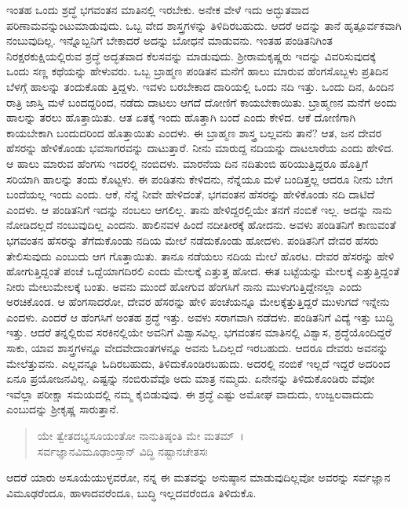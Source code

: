 ಇಂತಹ ಒಂದು ಶ್ರದ್ಧೆ ಭಗವಂತನ ಮಾತಿನಲ್ಲಿ ಇರಬೇಕು. ಅನೇಕ ವೇಳೆ ಇದು ಅದ್ಭುತವಾದ ಪರಿಣಾಮವನ್ನುಂಟುಮಾಡುವುದು. ಒಬ್ಬ ವೇದ ಶಾಸ್ತ್ರಗಳನ್ನು ತಿಳಿದಿರಬಹುದು. ಆದರೆ ಅದನ್ನು ತಾನೆ ಹೃತ್ಪೂರ್ವಕವಾಗಿ ನಂಬುವುದಿಲ್ಲ. ಇನ್ನೊಬ್ಬನಿಗೆ ಬೇಕಾದರೆ ಅದನ್ನು ಬೋಧನೆ ಮಾಡುವನು. ಇಂತಹ ಪಂಡಿತನಿಗಿಂತ ನಿರಕ್ಷರಕುಕ್ಷಿಯಲ್ಲಿರುವ ಶ್ರದ್ಧೆ ಅದ್ಭತವಾದ ಕೆಲಸವನ್ನು ಮಾಡುವುದು. ಶ‍್ರೀರಾಮಕೃಷ್ಣರು ಇದನ್ನು ವಿವರಿಸುವುದಕ್ಕೆ ಒಂದು ಸಣ್ಣ ಕಥೆಯನ್ನು ಹೇಳುವರು. ಒಬ್ಬ ಬ್ರಾಹ್ಮಣ ಪಂಡಿತನ ಮನೆಗೆ ಹಾಲು ಮಾರುವ ಹೆಂಗಸೊಬ್ಬಳು ಪ್ರತಿದಿನ ಬೆಳಗ್ಗೆ ಹಾಲನ್ನು ತಂದುಕೊಡು ತ್ತಿದ್ದಳು. ಇವಳು ಬರಬೇಕಾದ ದಾರಿಯಲ್ಲಿ ಒಂದು ನದಿ ಇತ್ತು. ಒಂದು ದಿನ, ಹಿಂದಿನ ರಾತ್ರಿ ಜಾಸ್ತಿ ಮಳೆ ಬಂದದ್ದರಿಂದ, ನಡೆದು ದಾಟಲು ಆಗದೆ ದೋಣಿಗೆ ಕಾಯಬೇಕಾಯಿತು. ಬ್ರಾಹ್ಮಣನ ಮನೆಗೆ ಅಂದು ಹಾಲನ್ನು ತರಲು ಹೊತ್ತಾಯಿತು. ಆತ ಏತಕ್ಕೆ ಇಂದು ಹೊತ್ತಾಗಿ ಬಂದೆ ಎಂದು ಕೇಳಿದ. ಆಕೆ ದೋಣಿಗಾಗಿ ಕಾಯಬೇಕಾಗಿ ಬಂದುದರಿಂದ ಹೊತ್ತಾಯಿತು ಎಂದಳು. ಈ ಬ್ರಾಹ್ಮಣ ಶಾಸ್ತ್ರ ಬಲ್ಲವನು ತಾನೆ? ಆತ, ಜನ ದೇವರ ಹೆಸರನ್ನು ಹೇಳಿಕೊಂಡು ಭವಸಾಗರವನ್ನು ದಾಟುತ್ತಾರೆ. ನೀನು ಮಾರುದ್ದ ನದಿಯನ್ನು ದಾಟಲಾರೆಯ ಎಂದು ಹೇಳಿದ. ಆ ಹಾಲು ಮಾರುವ ಹೆಂಗಸು ಇದರಲ್ಲಿ ನಂಬಿದಳು. ಮಾರನೆಯ ದಿನ ನದಿತುಂಬಿ ಹರಿಯುತ್ತಿದ್ದರೂ ಹೊತ್ತಿಗೆ ಸರಿಯಾಗಿ ಹಾಲನ್ನು ತಂದು ಕೊಟ್ಟಳು. ಈ ಪಂಡಿತನು ಕೇಳಿದನು, ನೆನ್ನೆಯೂ ಮಳೆ ಬಂದಿತ್ತಲ್ಲ ಆದರೂ ನೀನು ಬೇಗ ಬಂದೆಯಲ್ಲ ಇಂದು ಎಂದು. ಆಕೆ, ನೆನ್ನೆ ನೀವೇ ಹೇಳಿದಂತೆ, ಭಗವಂತನ ಹೆಸರನ್ನು ಹೇಳಿಕೊಂಡು ನದಿ ದಾಟಿದೆ ಎಂದಳು. ಆ ಪಂಡಿತನಿಗೆ ಇದನ್ನು ನಂಬಲು ಆಗಲಿಲ್ಲ. ತಾನು ಹೇಳಿದ್ದರಲ್ಲಿಯೇ ತನಗೆ ನಂಬಿಕೆ ಇಲ್ಲ. ಅದನ್ನು ನಾನು ನೋಡಿದಲ್ಲದೆ ನಂಬುವುದಿಲ್ಲ ಎಂದನು. ಹಾಲಿನವಳ ಹಿಂದೆ ನದೀತೀರಕ್ಕೆ ಹೋದನು. ಅವಳು ಪಂಡಿತನಿಗೆ ಕಾಣುವಂತೆ ಭಗವಂತನ ಹೆಸರನ್ನು ತೆಗೆದುಕೊಂಡು ನದಿಯ ಮೇಲೆ ನಡೆದುಕೊಂಡು ಹೋದಳು. ಪಂಡಿತನಿಗೆ ದೇವರ ಹೆಸರು ತೇಲಿಸುವುದು ಎಂಬುದು ಆಗ ಗೊತ್ತಾಯಿತು. ತಾನೂ ನಡೆಯಲು ನದಿಯ ಮೇಲೆ ಹೊರಟ. ದೇವರ ಹೆಸರನ್ನು ಹೇಳಿ ಹೋಗುತ್ತಿದ್ದಂತೆ ಪಂಚೆ ಒದ್ದೆಯಾಗದಿರಲಿ ಎಂದು ಮೇಲಕ್ಕೆ ಎತ್ತುತ್ತ ಹೋದ. ಈತ ಬಟ್ಟೆಯನ್ನು ಮೇಲಕ್ಕೆ ಎತ್ತುತ್ತಿದ್ದಂತೆ ನೀರು ಮೇಲುಮೇಲಕ್ಕೆ ಬಂತು. ಅವನು ಮುಂದೆ ಹೋಗುವ ಹೆಂಗಸಿಗೆ ನಾನು ಮುಳುಗುತ್ತಿದ್ದೇನಲ್ಲಾ ಎಂದು ಅರಚಿಕೊಂಡ. ಆ ಹೆಂಗಸಾದರೋ, ದೇವರ ಹೆಸರನ್ನು ಹೇಳಿ ಪಂಚೆಯನ್ನೂ ಮೇಲಕ್ಕೆತ್ತುತ್ತಿದ್ದರೆ ಮುಳುಗದೆ ಇನ್ನೇನು ಎಂದಳು. ಎಂದರೆ ಆ ಹೆಂಗಸಿಗೆ ಅಂತಹ ಶ್ರದ್ಧೆ ಇತ್ತು. ಅವಳು ಸರಾಗವಾಗಿ ನಡೆದಳು. ಪಂಡಿತನಿಗೆ ವಿದ್ಯೆ ಇತ್ತು ಬುದ್ಧಿ ಇತ್ತು. ಆದರೆ ತನ್ನಲ್ಲಿರುವ ಸರಕಿನಲ್ಲಿಯೇ ಅವನಿಗೆ ವಿಶ್ವಾಸವಿಲ್ಲ. ಭಗವಂತನ ಮಾತಿನಲ್ಲಿ ವಿಶ್ವಾಸ, ಶ್ರದ್ಧೆಯೊಂದಿದ್ದರೆ ಸಾಕು, ಯಾವ ಶಾಸ್ತ್ರಗಳನ್ನೂ ವೇದವೇದಾಂತಗಳನ್ನೂ ಅವನು ಓದಿಲ್ಲದೆ ಇರಬಹುದು. ಆದರೂ ದೇವರು ಅವನನ್ನು ಮೇಲೆತ್ತುವನು. ಎಲ್ಲವನ್ನೂ ಓದಿರಬಹುದು, ತಿಳಿದುಕೊಂಡಿರಬಹುದು. ಅದರಲ್ಲಿ ನಂಬಿಕೆ ಇಲ್ಲದೆ ಇದ್ದರೆ ಅದರಿಂದ ಏನೂ ಪ್ರಯೋಜನವಿಲ್ಲ. ಎಷ್ಟನ್ನು ನಂಬಿರುವೆವೊ ಅದು ಮಾತ್ರ ನಮ್ಮದು. ಏನೇನನ್ನು ತಿಳಿದುಕೊಂಡಿರು ವೆವೋ ಇವೆಲ್ಲಾ ಪರೀಕ್ಷಾ ಸಮಯದಲ್ಲಿ ನಮ್ಮ ಕೈಬಿಡುವುವು. ಈ ಶ್ರದ್ಧೆ ಎಷ್ಟು ಅಮೋಘ ವಾದುದು, ಉಜ್ವಲವಾದುದು ಎಂಬುದನ್ನು ಶ‍್ರೀಕೃಷ್ಣ ಸಾರುತ್ತಾನೆ.

\begin{verse}
ಯೇ ತ್ವೇತದಭ್ಯಸೂಯಂತೋ ನಾನುತಿಷ್ಠಂತಿ ಮೇ ಮತಮ್~।\\ಸರ್ವಜ್ಞಾನವಿಮೂಢಾಂಸ್ತಾನ್ ವಿದ್ಧಿ ನಷ್ಟಾನಚೇತಸಃ 
\end{verse}

{\small ಆದರೆ ಯಾರು ಅಸೂಯೆಯುಳ್ಳವರೋ, ನನ್ನ ಈ ಮತವನ್ನು ಅನುಷ್ಠಾನ ಮಾಡುವುದಿಲ್ಲವೋ ಅವರನ್ನು ಸರ್ವಜ್ಞಾನ ವಿಮೂಢರೆಂದೂ, ಹಾಳಾದವರೆಂದೂ, ಬುದ್ಧಿ ಇಲ್ಲದವರೆಂದೂ ತಿಳಿದುಕೊ.}

